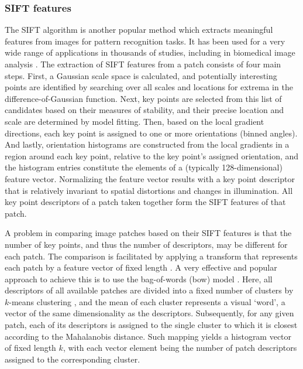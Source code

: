 \subsubsection{SIFT features}
\label{subsubsec:sift-and-bow}
The SIFT algorithm \cite{lowe2004distinctive} is another popular method which extracts meaningful features from images for pattern recognition tasks. It has been used for a very wide range of applications in thousands of studies, including in biomedical image analysis \cite{ni2009reconstruction, jiang2010live, mualla2013automatic, zhang2013nonrigid, ni2009reconstruction, yu2016fast}. The extraction of SIFT features from a patch consists of four main steps. First, a Gaussian scale space is calculated, and potentially interesting points are identified by searching over all scales and locations for extrema in the difference-of-Gaussian function. Next, key points are selected from this list of candidates based on their measures of stability, and their precise location and scale are determined by model fitting. Then, based on the local gradient directions, each key point is assigned to one or more orientations (binned angles). And lastly, orientation histograms are constructed from the local gradients in a region around each key point, relative to the key point's assigned orientation, and the histogram entries constitute the elements of a (typically 128-dimensional) feature vector. Normalizing the feature vector results with a key point descriptor that is relatively invariant to spatial distortions and changes in illumination. All key point descriptors of a patch taken together form the SIFT features of that patch.

A problem in comparing image patches based on their SIFT features is that the number of key points, and thus the number of descriptors, may be different for each patch. The comparison is facilitated by applying a transform that represents each patch by a feature vector of fixed length \cite{yang2009linear}. A very effective and popular approach to achieve this is to use the bag-of-words (\gls{bow}) model \cite{fei2005bayesian}. Here, all descriptors of all available patches are divided into a fixed number of clusters by $k$-means clustering \cite{macqueen1967some}, and the mean of each cluster represents a visual `word', a vector of the same dimensionality as the descriptors. Subsequently, for any given patch, each of its descriptors is assigned to the single cluster to which it is closest according to the Mahalanobis distance. Such mapping yields a histogram vector of fixed length $k$, with each vector element being the number of patch descriptors assigned to the corresponding cluster.

